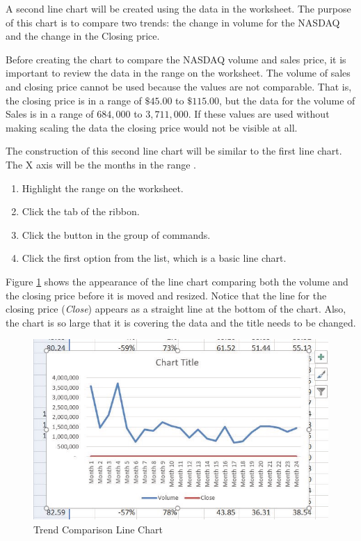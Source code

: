 A second line chart will be created using the data in the  worksheet. The purpose of this chart is to compare two trends: the change in volume for the NASDAQ and the change in the Closing price.

Before creating the chart to compare the NASDAQ volume and sales price, it is important to review the data in the range  on the  worksheet. The volume of sales and closing price cannot be used because the values are not comparable. That is, the closing price is in a range of $ \$45.00 $ to $ \$115.00 $, but the data for the volume of Sales is in a range of $ 684,000 $ to $ 3,711,000 $. If these values are used without making scaling the data the closing price would not be visible at all.

The construction of this second line chart will be similar to the first line chart. The X axis will be the months in the range .

\begin{enumerate}
	\item Highlight the range  on the  worksheet.
	\item Click the  tab of the ribbon.
	\item Click the  button in the  group of commands.
	\item Click the first option from the list, which is a basic line chart.
\end{enumerate}

Figure \ref{04:fig07} shows the appearance of the line chart comparing both the volume and the closing price before it is moved and resized. Notice that the line for the closing price (\textit{Close}) appears as a straight line at the bottom of the chart. Also, the chart is so large that it is covering the data and the title needs to be changed.

\begin{figure}[H]
	\centering
	\includegraphics[width=\maxwidth{.95\linewidth}]{gfx/ch04_fig07}
	\caption{Trend Comparison Line Chart}
	\label{04:fig07}
\end{figure}

